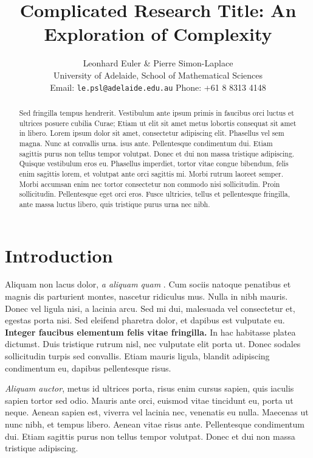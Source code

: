 \documentclass[12pt,a4paper]{article}\def\nCols{1}
\title{Complicated Research Title: 
An Exploration of Complexity}
\author{Leonhard Euler \&  Pierre Simon-Laplace\\
University of Adelaide, School of Mathematical Sciences\\
Email: \texttt{le.psl@adelaide.edu.au} \qquad Phone: +61 8 8313 4148}
\begin{document}
\maketitle

\begin{abstract}
Sed fringilla tempus hendrerit. Vestibulum ante ipsum primis in faucibus orci luctus et ultrices posuere cubilia Curae; Etiam ut elit sit amet metus lobortis consequat sit amet in libero. Lorem ipsum dolor sit amet, consectetur adipiscing elit. Phasellus vel sem magna. Nunc at convallis urna. isus ante. Pellentesque condimentum dui. Etiam sagittis purus non tellus tempor volutpat. Donec et dui non massa tristique adipiscing. Quisque vestibulum eros eu. Phasellus imperdiet, tortor vitae congue bibendum, felis enim sagittis lorem, et volutpat ante orci sagittis mi. Morbi rutrum laoreet semper. Morbi accumsan enim nec tortor consectetur non commodo nisi sollicitudin. Proin sollicitudin. Pellentesque eget orci eros. Fusce ultricies, tellus et pellentesque fringilla, ante massa luctus libero, quis tristique purus urna nec nibh.
\end{abstract}





\section{Introduction}

Aliquam non lacus dolor, \textit{a aliquam quam} \cite{Smith:2012qr}. Cum sociis natoque penatibus et magnis dis parturient montes, nascetur ridiculus mus. Nulla in nibh mauris. Donec vel ligula nisi, a lacinia arcu. Sed mi dui, malesuada vel consectetur et, egestas porta nisi. Sed eleifend pharetra dolor, et dapibus est vulputate eu. \textbf{Integer faucibus elementum felis vitae fringilla.} In hac habitasse platea dictumst. Duis tristique rutrum nisl, nec vulputate elit porta ut. Donec sodales sollicitudin turpis sed convallis. Etiam mauris ligula, blandit adipiscing condimentum eu, dapibus pellentesque risus.

\textit{Aliquam auctor}, metus id ultrices porta, risus enim cursus sapien, quis iaculis sapien tortor sed odio. Mauris ante orci, euismod vitae tincidunt eu, porta ut neque. Aenean sapien est, viverra vel lacinia nec, venenatis eu nulla. Maecenas ut nunc nibh, et tempus libero. Aenean vitae risus ante. Pellentesque condimentum dui. Etiam sagittis purus non tellus tempor volutpat. Donec et dui non massa tristique adipiscing.
\end{document}
